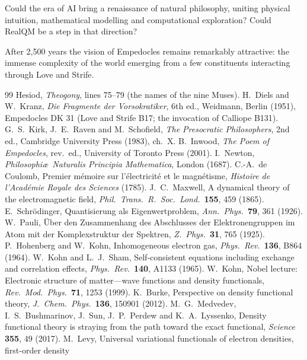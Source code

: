 \documentclass[11pt]{article}
\begin{document}
Could the era of AI bring a renaissance of natural philosophy, uniting physical intuition, mathematical
modelling and computational exploration? Could RealQM be a step in that direction?

After 2{,}500 years the vision of Empedocles remains remarkably attractive: the immense complexity of the
world emerging from a few constituents interacting through Love and Strife.

\begin{thebibliography}{99}\small
{} Hesiod, \emph{Theogony}, lines 75--79 (the names of the nine Muses).
 H.\ Diels and W.\ Kranz, \emph{Die Fragmente der Vorsokratiker}, 6th ed., Weidmann, Berlin
(1951), Empedocles DK 31 (Love and Strife B17; the invocation of Calliope B131).
 G.\ S.\ Kirk, J.\ E.\ Raven and M.\ Schofield, \emph{The Presocratic Philosophers}, 2nd ed.,
Cambridge University Press (1983), ch.\ X.
 B.\ Inwood, \emph{The Poem of Empedocles}, rev.\ ed., University of Toronto Press (2001).
 I.\ Newton, \emph{Philosophi\ae\ Naturalis Principia Mathematica}, London (1687).
 C.-A.\ de Coulomb, Premier m\'emoire sur l'\'electricit\'e et le magn\'etisme,
\emph{Histoire de l'Acad\'emie Royale des Sciences} (1785).
 J.\ C.\ Maxwell, A dynamical theory of the electromagnetic field, \emph{Phil.\ Trans.\
R.\ Soc.\ Lond.}\ \textbf{155}, 459 (1865).
 E.\ Schr\"odinger, Quantisierung als Eigenwertproblem, \emph{Ann.\ Phys.}\
\textbf{79}, 361 (1926).
\bibitem{pauli} W.\ Pauli, \"Uber den Zusammenhang des Abschlusses der Elektronengruppen im Atom mit der
Komplexstruktur der Spektren, \emph{Z.\ Phys.}\ \textbf{31}, 765 (1925).
\bibitem{hk} P.\ Hohenberg and W.\ Kohn, Inhomogeneous electron gas, \emph{Phys.\ Rev.}\ \textbf{136}, B864 (1964).
\bibitem{ks} W.\ Kohn and L.\ J.\ Sham, Self-consistent equations including exchange and correlation effects,
\emph{Phys.\ Rev.}\ \textbf{140}, A1133 (1965).
\bibitem{kohn99} W.\ Kohn, Nobel lecture: Electronic structure of matter---wave functions and density
functionals, \emph{Rev.\ Mod.\ Phys.}\ \textbf{71}, 1253 (1999).
\bibitem{burke} K.\ Burke, Perspective on density functional theory, \emph{J.\ Chem.\ Phys.}\ \textbf{136},
150901 (2012).
\bibitem{medvedev} M.\ G.\ Medvedev, I.\ S.\ Bushmarinov, J.\ Sun, J.\ P.\ Perdew and K.\ A.\ Lyssenko,
Density functional theory is straying from the path toward the exact functional, \emph{Science}
\textbf{355}, 49 (2017).
\bibitem{levy} M.\ Levy, Universal variational functionals of electron densities, first-order density

\end{thebibliography}
\end{document}
